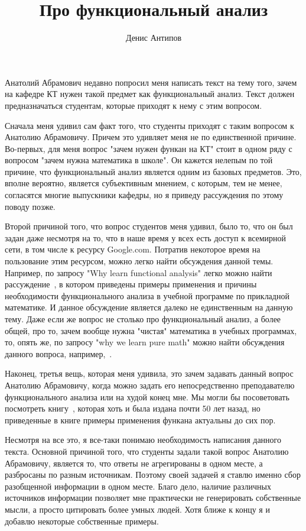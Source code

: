 \documentclass[russian]{article}
\title{Про функциональный анализ}
\author{Денис Антипов}
\begin{document}
\maketitle

Анатолий Абрамович недавно попросил меня написать текст на тему того, зачем на кафедре КТ нужен такой предмет как функциональный анализ. Текст должен предназначаться студентам, которые приходят к нему с этим вопросом.

Сначала меня удивил сам факт того, что студенты приходят с таким вопросом к Анатолию Абрамовичу. Причем это удивляет меня не по единственной причине. Во-первых, для меня вопрос "зачем нужен функан на КТ" стоит в одном ряду с вопросом "зачем нужна математика в школе". Он кажется нелепым по той причине, что функциональный анализ является одним из базовых предметов. Это, вполне вероятно, является субъективным мнением, с которым, тем не менее, согласятся многие выпускники кафедры, но я приведу рассуждения по этому поводу позже.

Второй причиной того, что вопрос студентов меня удивил, было то, что он был задан даже несмотря на то, что в наше время у всех есть доступ к всемирной сети, в том числе к ресурсу Google.com. Потратив некоторое время на пользование этим ресурсом, можно легко найти обсуждения данной темы. Например, по запросу "Why learn functional analysis" легко можно найти рассуждение~\cite{why-funcan}, в котором приведены примеры применения и причины необходимости функционального анализа в учебной программе по прикладной математике. И данное обсуждение является далеко не единственным на данную тему. Даже если же вопрос не столько про функциональный анализ, а более общей, про то, зачем вообще нужна "чистая" математика в учебных программах, то, опять же, по запросу "why we learn pure math" можно найти обсуждения данного вопроса, например,~\cite{why-pure-math}.

Наконец, третья вещь, которая меня удивила, это зачем задавать данный вопрос Анатолию Абрамовичу, когда можно задать его непосредственно преподавателю функционального анализа или на худой конец мне. Мы могли бы посоветовать посмотреть книгу~\cite{kollats}, которая хоть и была издана почти 50 лет назад, но приведенные в книге примеры применения функана актуальны до сих пор.

Несмотря на все это, я все-таки понимаю необходимость написания данного текста. Основной причиной того, что студенты задали такой вопрос Анатолию Абрамовичу, является то, что ответы не агрегированы в одном месте, а разбросаны по разным источникам. Поэтому своей задачей я ставлю именно сбор разобщенной информации в одном месте. Благо дело, наличие различных источников информации позволяет мне практически не генерировать собственные мысли, а просто цитировать более умных людей. Хотя ближе к концу я и добавлю некоторые собственные примеры.
\end{document}
